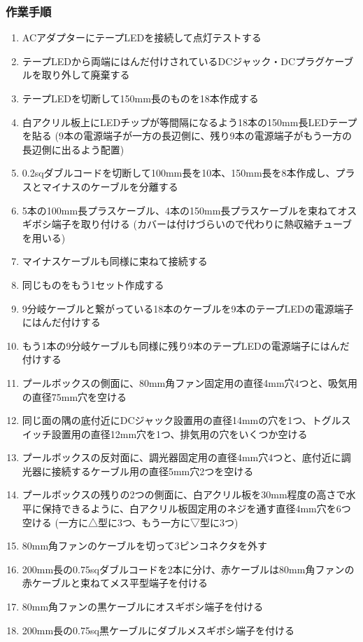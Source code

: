 \documentclass[titlepage,10pt,a4paper,uplatex]{jsbook}
\begin{document}
\subsubsection{作業手順}
\begin{enumerate}
\item ACアダプターにテープLEDを接続して点灯テストする
\item テープLEDから両端にはんだ付けされているDCジャック・DCプラグケーブルを取り外して廃棄する
\item テープLEDを切断して150mm長のものを18本作成する
\item 白アクリル板上にLEDチップが等間隔になるよう18本の150mm長LEDテープを貼る (9本の電源端子が一方の長辺側に、残り9本の電源端子がもう一方の長辺側に出るよう配置)
\item 0.2sqダブルコードを切断して100mm長を10本、150mm長を8本作成し、プラスとマイナスのケーブルを分離する
\item 5本の100mm長プラスケーブル、4本の150mm長プラスケーブルを束ねてオスギボシ端子を取り付ける (カバーは付けづらいので代わりに熱収縮チューブを用いる)
\item マイナスケーブルも同様に束ねて接続する
\item 同じものをもう1セット作成する
\item 9分岐ケーブルと繋がっている18本のケーブルを9本のテープLEDの電源端子にはんだ付けする
\item もう1本の9分岐ケーブルも同様に残り9本のテープLEDの電源端子にはんだ付けする
\item プールボックスの側面に、80mm角ファン固定用の直径4mm穴4つと、吸気用の直径75mm穴を空ける
\item 同じ面の隅の底付近にDCジャック設置用の直径14mmの穴を1つ、トグルスイッチ設置用の直径12mm穴を1つ、排気用の穴をいくつか空ける
\item プールボックスの反対面に、調光器固定用の直径4mm穴4つと、底付近に調光器に接続するケーブル用の直径5mm穴2つを空ける
\item プールボックスの残りの2つの側面に、白アクリル板を30mm程度の高さで水平に保持できるように、白アクリル板固定用のネジを通す直径4mm穴を6つ空ける (一方に△型に3つ、もう一方に▽型に3つ)
\item 80mm角ファンのケーブルを切って3ピンコネクタを外す
\item 200mm長の0.75sqダブルコードを2本に分け、赤ケーブルは80mm角ファンの赤ケーブルと束ねてメス平型端子を付ける
\item 80mm角ファンの黒ケーブルにオスギボシ端子を付ける
\item 200mm長の0.75sq黒ケーブルにダブルメスギボシ端子を付ける

\end{enumerate}
\end{document}
